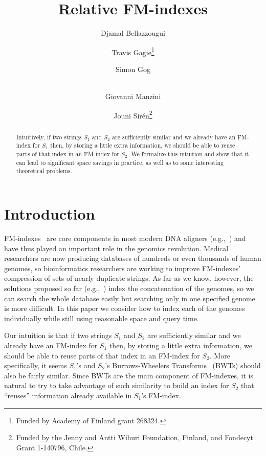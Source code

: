 \documentclass{llncs}
\begin{document}
\title{Relative FM-indexes}

\author{Djamal Bellazzougui \and Travis Gagie\fnmsep\thanks{Funded by Academy of Finland grant 268324.} \and Simon Gog \and\\
Giovanni Manzini \and Jouni Sir\'en\fnmsep\thanks{Funded by the Jenny and Antti Wihuri Foundation, Finland, and Fondecyt Grant 1-140796, Chile.}}

\maketitle

\begin{abstract}
Intuitively, if two strings $S_1$ and $S_2$ are sufficiently similar and we already have an FM-index for $S_1$ then, by storing a little extra information, we should be able to reuse parts of that index in an FM-index for $S_2$.  We formalize this intuition and show that it can lead to significant space savings in practice, as well as to some interesting theoretical problems.
\end{abstract}


\section{Introduction} \label{sec:introduction}

FM-indexes~\cite{FM05} are core components in most modern DNA aligners
(e.g.,~\cite{LTPS09,LD09,LYLLYKW09}) and have thus played an important role
in the genomics revolution.  Medical researchers are now producing databases
of hundreds or even thousands of human genomes, so bioinformatics researchers
are working to improve FM-indexes' compression of sets of nearly duplicate
strings.  As far as we know, however, the solutions proposed so far
(e.g.,~\cite{FGHP14,MNSV10}) index the concatenation of the genomes, so we
can search the whole database easily but searching only in one specified
genome is more difficult.  In this paper we consider how to index each of the
genomes individually while still using reasonable space and query time.

Our intuition is that if two strings $S_1$ and $S_2$ are sufficiently similar
and we already have an FM-index for $S_1$ then, by storing a little extra
information, we should be able to reuse parts of that index in an FM-index
for $S_2$. More specifically, it seems $S_1$'s and $S_2$'s Burrows-Wheelers
Transforms~\cite{BW94} (BWTs) should also be fairly similar. Since BWTs are
the main component of FM-indexes, it is natural to try to take advantage of
such similarity to build an index for $S_2$ that ``reuses'' information
already available in $S_1$'s FM-index.
\end{document}
